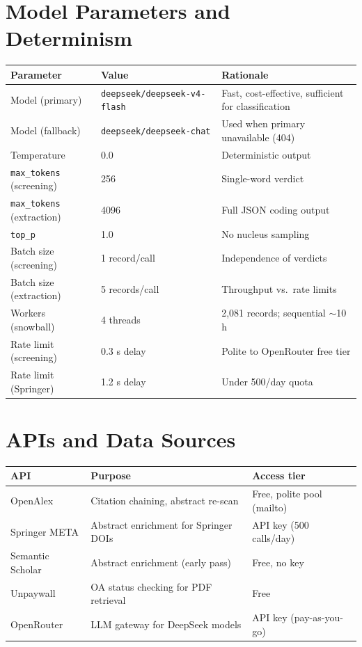 \section{Model Parameters and Determinism}

\begin{table}[H]
\centering
\small
\begin{tabular}{llp{4.6cm}}
\toprule
\textbf{Parameter} & \textbf{Value} & \textbf{Rationale} \\
\midrule
Model (primary) & \texttt{deepseek/\allowbreak deepseek-v4-flash} & Fast, cost-effective, sufficient for classification \\
Model (fallback) & \texttt{deepseek/\allowbreak deepseek-chat} & Used when primary unavailable (404) \\
Temperature & 0.0 & Deterministic output \\
\texttt{max\_tokens} (screening) & 256 & Single-word verdict \\
\texttt{max\_tokens} (extraction) & 4096 & Full JSON coding output \\
\texttt{top\_p} & 1.0 & No nucleus sampling \\
Batch size (screening) & 1 record/call & Independence of verdicts \\
Batch size (extraction) & 5 records/call & Throughput vs.\ rate limits \\
Workers (snowball) & 4 threads & 2,081 records; sequential $\sim$10 h \\
Rate limit (screening) & 0.3 s delay & Polite to OpenRouter free tier \\
Rate limit (Springer) & 1.2 s delay & Under 500/day quota \\
\bottomrule
\end{tabular}
\end{table}

\section{APIs and Data Sources}

\begin{table}[H]
\centering
\begin{tabular}{lp{5.5cm}p{4.5cm}}
\toprule
\textbf{API} & \textbf{Purpose} & \textbf{Access tier} \\
\midrule
OpenAlex & Citation chaining, abstract re-scan & Free, polite pool (mailto) \\
Springer META & Abstract enrichment for Springer DOIs & API key (500 calls/day) \\
Semantic Scholar & Abstract enrichment (early pass) & Free, no key \\
Unpaywall & OA status checking for PDF retrieval & Free \\
OpenRouter & LLM gateway for DeepSeek models & API key (pay-as-you-go) \\
\bottomrule
\end{tabular}
\end{table}

